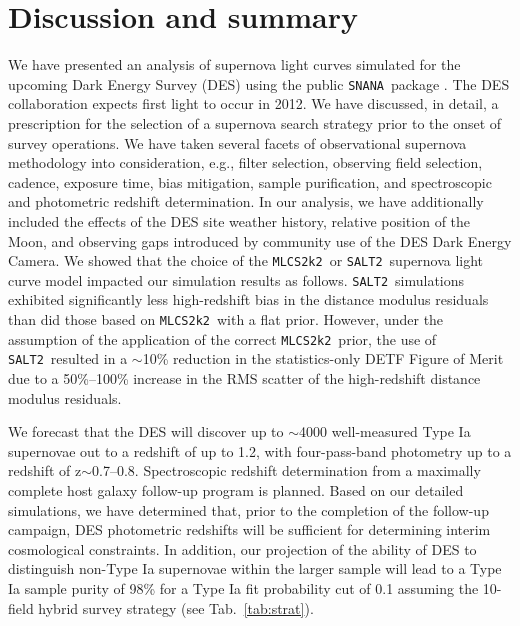 \documentclass[preprint2]{aastex}    %
\newcommand{\mlcs}{{\tt MLCS2k2}}
\newcommand{\salt}{{\tt SALT2}}
\newcommand{\snana}{{\tt SNANA}}
\begin{document}
\section{Discussion and summary}\label{sec:discuss}
We have presented an analysis of supernova light curves simulated for the 
upcoming Dark Energy Survey (DES) using the
public \snana\ package \citep{snana}. 
The DES collaboration expects first light to occur in 2012. We have discussed, in detail, 
a prescription for the %
selection of a supernova search strategy prior to the 
onset of survey operations. We have taken several facets of observational supernova 
methodology into consideration, e.g., filter selection, observing field selection, 
cadence, exposure time, bias mitigation, sample purification, and spectroscopic 
and photometric redshift determination. In our analysis, we have additionally 
included the effects of the DES site weather history, relative position of the Moon, 
and observing gaps introduced by community use of the DES Dark Energy Camera. 
We showed that the choice of the \mlcs\ or \salt\ supernova light curve model impacted
our simulation results as follows. \salt\ simulations exhibited significantly
less high-redshift bias in the distance modulus residuals than did those based on 
\mlcs\ with a flat prior. However, under the assumption of the application of the 
correct \mlcs\ prior, the use of \salt\ resulted in a $\sim$10\% reduction in the
statistics-only DETF 
Figure of Merit due to a 50\%--100\% increase in the RMS scatter of the 
high-redshift distance modulus residuals.   

We forecast that the DES will discover up to $\sim$4000 well-measured Type Ia 
supernovae out to a redshift of up to 1.2, with four-pass-band  photometry up
to a redshift of z$\sim$0.7--0.8. Spectroscopic redshift determination
from a maximally complete host galaxy follow-up program is planned. 
Based on our detailed simulations, we have determined that, prior to the completion of the 
follow-up campaign, DES photometric redshifts will be sufficient for determining
interim cosmological constraints. In addition, our projection of the ability of
DES to distinguish non-Type Ia supernovae within the larger sample will lead to
a Type Ia sample purity of 98\% for a Type Ia fit probability 
cut of 0.1 assuming the 10-field hybrid survey strategy (see Tab.~\ref{tab:strat}). 
\end{document}
